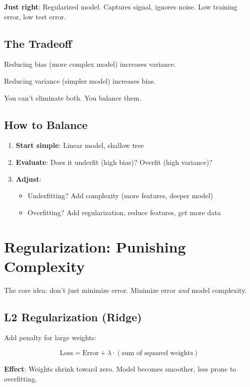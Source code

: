\documentclass[11pt,oneside]{book}
\begin{document}
\textbf{Just right}: Regularized model. Captures signal, ignores noise. Low training error, low test error.

\subsection{The Tradeoff}

Reducing bias (more complex model) increases variance.

Reducing variance (simpler model) increases bias.

You can't eliminate both. You balance them.

\subsection{How to Balance}

\begin{enumerate}
    \item \textbf{Start simple}: Linear model, shallow tree
    \item \textbf{Evaluate}: Does it underfit (high bias)? Overfit (high variance)?
    \item \textbf{Adjust}:
    \begin{itemize}
        \item Underfitting? Add complexity (more features, deeper model)
        \item Overfitting? Add regularization, reduce features, get more data
    \end{itemize}
\end{enumerate}

\section{Regularization: Punishing Complexity}

The core idea: don't just minimize error. Minimize error \textit{and} model complexity.

\subsection{L2 Regularization (Ridge)}

Add penalty for large weights:

\begin{equation}
\text{Loss} = \text{Error} + \lambda \cdot (\text{sum of squared weights})
\end{equation}

\textbf{Effect}: Weights shrink toward zero. Model becomes smoother, less prone to overfitting.
\end{document}
